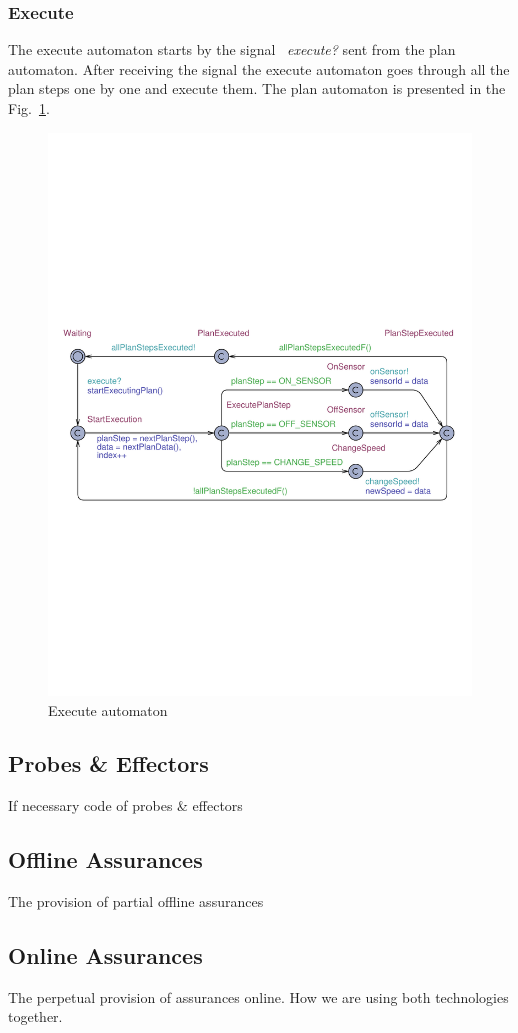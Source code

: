 \subsubsection{Execute}
The execute automaton starts by the signal ~\textit{execute?} sent from the plan automaton. After receiving the signal the execute automaton goes through all the plan steps one by one and execute them. The plan automaton is presented in the Fig.~\ref{fig:execute-automaton}.

\begin{figure}[t]
	\centering
	\includegraphics[width=1\textwidth]{figures/Executor}
	\caption{Execute automaton}\label{fig:execute-automaton}
	
	\vspace*{-2mm}
\end{figure}


\subsection{Probes \& Effectors}
If necessary code of probes \& effectors

\subsection{Offline Assurances}
The provision of partial offline assurances

\subsection{Online Assurances}
The perpetual provision of assurances online. How we are using both technologies together.